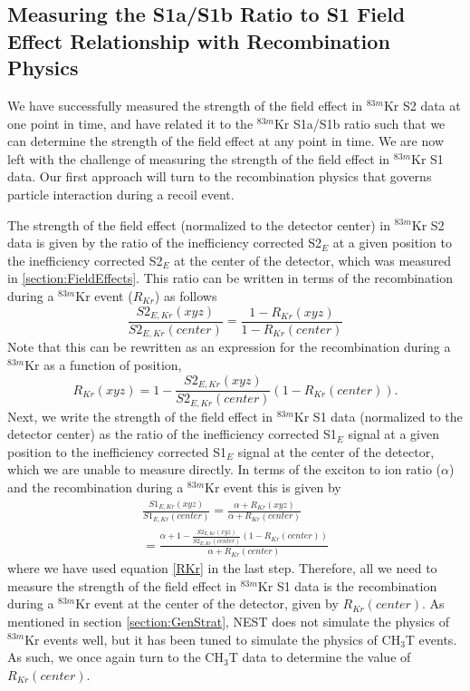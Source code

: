 \subsection{Measuring the S1a/S1b Ratio to S1 Field Effect Relationship with Recombination Physics} \label{section:S1relation}

We have successfully measured the strength of the field effect in $^{83m}$Kr S2 data at one point in time, and have related it to the $^{83m}$Kr S1a/S1b ratio such that we can determine the strength of the field effect at any point in time.  We are now left with the challenge of measuring the strength of the field effect in $^{83m}$Kr S1 data. Our first approach will turn to the recombination physics that governs particle interaction during a recoil event.  

The strength of the field effect (normalized to the detector center) in $^{83m}$Kr S2 data is given by the ratio of the inefficiency corrected S2$_E$ at a given position to the inefficiency corrected S2$_E$ at the center of the detector, which was measured in \ref{section:FieldEffects}.  This ratio can be written in terms of the recombination during a $^{83m}$Kr event ($R_{Kr}$) as follows
\begin{equation}
\frac{S2_{E,Kr}(xyz)}{S2_{E,Kr}(center)} = \frac{1-R_{Kr}(xyz)}{1-R_{Kr}(center)}
\end{equation}
Note that this can be rewritten as an expression for the recombination during a $^{83m}$Kr as a function of position,
\begin{equation} \label{RKr}
R_{Kr}(xyz) = 1- \frac{S2_{E,Kr}(xyz)}{S2_{E,Kr}(center)}(1-R_{Kr}(center)).
\end{equation}
Next, we write the strength of the field effect in $^{83m}$Kr S1 data (normalized to the detector center) as the ratio of the inefficiency corrected S1$_E$ signal at a given position to the inefficiency corrected S1$_E$ signal at the center of the detector, which we are unable to measure directly.  In terms of the exciton to ion ratio ($\alpha$) and the recombination during a $^{83m}$Kr event this is given by 
\begin{multline} \label{S1fieldstrength}
\frac{S1_{E,Kr}(xyz)}{S1_{E,Kr}(center)}=\frac{\alpha+R_{Kr}(xyz)}{\alpha+R_{Kr}(center)} \\ = \frac{\alpha + 1 - \frac{S2_{E,Kr}(xyz)}{S2_{E,Kr}(center)}(1-R_{Kr}(center))}{\alpha + R_{Kr}(center)}
\end{multline}
where we have used equation \ref{RKr} in the last step.  Therefore, all we need to measure the strength of the field effect in $^{83m}$Kr S1 data is the recombination during a $^{83m}$Kr event at the center of the detector, given by $R_{Kr}(center)$.  As mentioned in section \ref{section:GenStrat}, NEST does not simulate the physics of $^{83m}$Kr events well, but it has been tuned to simulate the physics of CH$_3$T events.  As such, we once again turn to the CH$_3$T data to determine the value of $R_{Kr}(center)$. 

